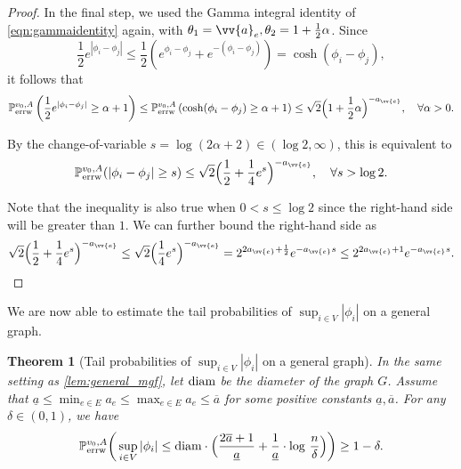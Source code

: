 \documentclass[a4paper, 11pt]{article}
\renewcommand{\P}{\mathbb{P}}
\newcommand{\Perrw}{\P_{\textnormal{errw}}}
\newcommand{\diam}{\textnormal{diam}}
\newtheorem{thm}{Theorem}[section]
\begin{document}
\begin{proof}
In the final step, we used the Gamma integral identity of \cref{eqn:gammaidentity} again,
with $\theta_1=\vv{a}_e, \theta_2=1+\frac{1}{2} \alpha$. Since
\[
\frac{1}{2} e^{|\phi_i - \phi_j|} \leq \frac{1}{2}(e^{\phi_i - \phi_j} + e^{-(\phi_i - \phi_j)}) = \cosh(\phi_i - \phi_j),
\]
it follows that
\[
\Perrw^{v_0,A}\left(\frac{1}{2} e^{|\phi_i - \phi_j|} \geq \alpha + 1 \right) \leq \Perrw^{v_0,A}\left(\cosh(\phi_i - \phi_j) \geq \alpha + 1 \right) \leq \sqrt{2} \Big( 1 + \frac{1}{2} \alpha \Big)^{-a_{\vv{e}}}, \quad \forall \alpha > 0.
\]

By the change-of-variable $s=\log(2\alpha+2)\in(\log2,\infty)$, this is equivalent to
\[
\Perrw^{v_0,A}(|\phi_i - \phi_j| \geq s) \leq \sqrt{2} \Big( \frac{1}{2} + \frac{1}{4} e^s \Big)^{-a_{\vv{e}}}, \quad \forall s > \log 2.
\]

Note that the inequality is also true when $0<s\leq \log 2$ since the right-hand side will be greater than $1$. We can further bound the right-hand side as
\[\sqrt{2} \Big(\frac{1}{2} + \frac{1}{4} e^s \Big)^{-a_{\vv{e}}} \leq \sqrt{2} \Big(\frac{1}{4} e^s\Big)^{-a_{\vv{e}}} = 2^{2a_{\vv{e}}+\frac{1}{2}} e^{-a_{\vv{e}} s} \leq 2^{2a_{\vv{e}}+1} e^{-a_{\vv{e}} s}.\]
\end{proof}

We are now able to estimate the tail probabilities of 
$\sup_{i\in V}|\phi_i|$ on a general graph.


\vspace{0.3em}
\begin{thm}[Tail probabilities of $\sup_{i\in V}|\phi_i|$ on a general graph]
\label{thm:fluc_phi}
In the same setting as \cref{lem:general_mgf}, let \( \diam \) be the diameter of the graph $G$. Assume that $\underline{a}\leq \min_{e\in E} a_e\leq \max_{e\in E} a_e \leq \overline{a}$ for some positive constants $\underline{a}, \overline{a}$. For any \( \delta \in (0,1) \), we have
\[
\Perrw^{v_0,A}\bigg(\sup_{i \in V} |\phi_i| \leq \diam\cdot \Big(\frac{2\overline{a}+1}{\underline{a}}+\frac{1}{\underline{a}}\cdot \log\,\frac{n}{\delta}\Big) \bigg) \geq 1 - \delta.
\]
\end{thm}
\end{document}
